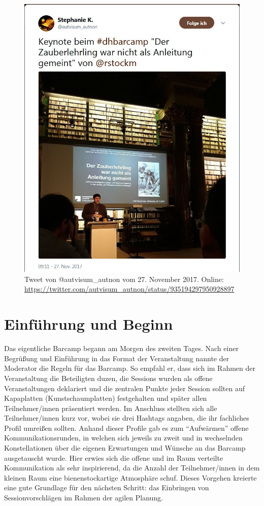 \documentclass[a4paper,
fontsize=11pt,
oneside,
numbers=noperiodatend,
parskip=half-,
bibliography=totoc,
final
]{scrartcl}
\begin{document}
\begin{figure}
\centering
\includegraphics{img/Abbildung3.jpg}
\caption{Tweet von @autvisum\_autnon vom 27. November 2017. Online:
\href{https://twitter.com/autvisum\_autnon/status/935194297950928897}{https://twitter.com/autvisum\_autnon/status/935194297950928897}}
\end{figure}

\hypertarget{einfuxfchrung-und-beginn}{%
\section{Einführung und Beginn}\label{einfuxfchrung-und-beginn}}

Das eigentliche Barcamp begann am Morgen des zweiten Tages. Nach einer
Begrüßung und Einführung in das Format der Veranstaltung nannte der
Moderator die Regeln für das Barcamp. So empfahl er, dass sich im Rahmen
der Veranstaltung die Beteiligten duzen, die Sessions wurden als offene
Veranstaltungen deklariert und die zentralen Punkte jeder Session
sollten auf Kapaplatten (Kunstschaumplatten) festgehalten und später
allen Teilnehmer/innen präsentiert werden. Im Anschluss stellten sich
alle Teilnehmer/innen kurz vor, wobei sie drei Hashtags angaben, die ihr
fachliches Profil umreißen sollten. Anhand dieser Profile gab es zum
\enquote{Aufwärmen} offene Kommunikationsrunden, in welchen sich jeweils
zu zweit und in wechselnden Konstellationen über die eigenen Erwartungen
und Wünsche an das Barcamp ausgetauscht wurde. Hier erwies sich die
offene und im Raum verteilte Kommunikation als sehr inspirierend, da die
Anzahl der Teilnehmer/innen in dem kleinen Raum eine bienenstockartige
Atmosphäre schuf. Dieses Vorgehen kreierte eine gute Grundlage für den
nächsten Schritt: das Einbringen von Sessionvorschlägen im Rahmen der
agilen Planung.
\end{document}
